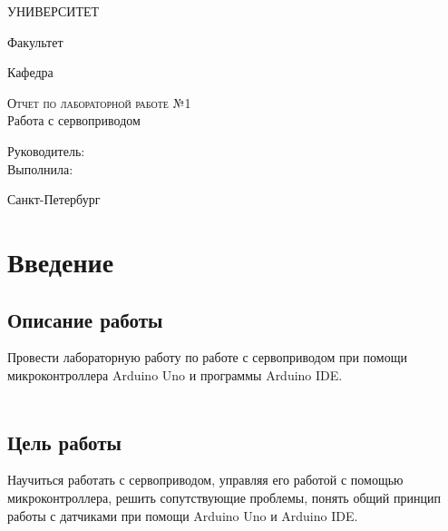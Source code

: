 \documentclass[12pt,a4paper]{scrartcl}
\begin{document}
\begin{titlepage}
  \begin{center}
    \large
 
    УНИВЕРСИТЕТ
    \vspace{0.25cm}
     
    Факультет 
     
    Кафедра 
    \vfill
 
    \textsc{Отчет по лабораторной работе №1}\\[5mm]
     
    {\LARGE Работа с сервоприводом}

\end{center}
\vfill
 
\newlength{\ML}
\hfill\begin{minipage}{0.4\textwidth}
  Руководитель: \\
  Выполнила:  \\
  
  
\end{minipage}%
\bigskip

 
\begin{center}
  Санкт-Петербург
\end{center}
\end{titlepage}

\begin{tableofcontents}
\end{tableofcontents}
    \newpage
    
\section{Введение}

\label{sec:intro}
 

\subsection{Описание работы}
Провести лабораторную работу по работе с сервоприводом при помощи микроконтроллера Arduino Uno и программы Arduino IDE.\\
\\

\subsection{Цель работы}
Научиться работать с сервоприводом, управляя его работой с помощью микроконтроллера, решить сопутствующие проблемы, понять общий принцип работы с датчиками при помощи Arduino Uno и Arduino IDE.
\end{document}
